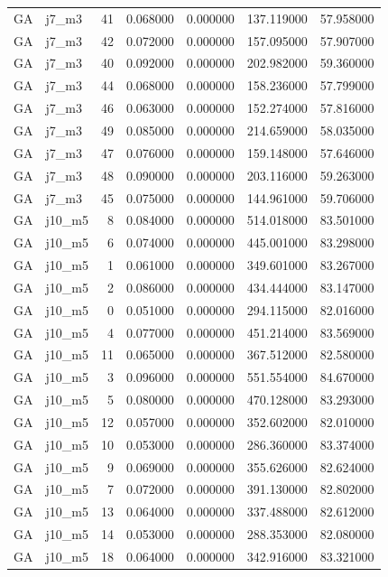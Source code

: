 \begin{tabular}{llrrrrr}
GA & j7_m3 & 41 & 0.068000 & 0.000000 & 137.119000 & 57.958000 \\
GA & j7_m3 & 42 & 0.072000 & 0.000000 & 157.095000 & 57.907000 \\
GA & j7_m3 & 40 & 0.092000 & 0.000000 & 202.982000 & 59.360000 \\
GA & j7_m3 & 44 & 0.068000 & 0.000000 & 158.236000 & 57.799000 \\
GA & j7_m3 & 46 & 0.063000 & 0.000000 & 152.274000 & 57.816000 \\
GA & j7_m3 & 49 & 0.085000 & 0.000000 & 214.659000 & 58.035000 \\
GA & j7_m3 & 47 & 0.076000 & 0.000000 & 159.148000 & 57.646000 \\
GA & j7_m3 & 48 & 0.090000 & 0.000000 & 203.116000 & 59.263000 \\
GA & j7_m3 & 45 & 0.075000 & 0.000000 & 144.961000 & 59.706000 \\
GA & j10_m5 & 8 & 0.084000 & 0.000000 & 514.018000 & 83.501000 \\
GA & j10_m5 & 6 & 0.074000 & 0.000000 & 445.001000 & 83.298000 \\
GA & j10_m5 & 1 & 0.061000 & 0.000000 & 349.601000 & 83.267000 \\
GA & j10_m5 & 2 & 0.086000 & 0.000000 & 434.444000 & 83.147000 \\
GA & j10_m5 & 0 & 0.051000 & 0.000000 & 294.115000 & 82.016000 \\
GA & j10_m5 & 4 & 0.077000 & 0.000000 & 451.214000 & 83.569000 \\
GA & j10_m5 & 11 & 0.065000 & 0.000000 & 367.512000 & 82.580000 \\
GA & j10_m5 & 3 & 0.096000 & 0.000000 & 551.554000 & 84.670000 \\
GA & j10_m5 & 5 & 0.080000 & 0.000000 & 470.128000 & 83.293000 \\
GA & j10_m5 & 12 & 0.057000 & 0.000000 & 352.602000 & 82.010000 \\
GA & j10_m5 & 10 & 0.053000 & 0.000000 & 286.360000 & 83.374000 \\
GA & j10_m5 & 9 & 0.069000 & 0.000000 & 355.626000 & 82.624000 \\
GA & j10_m5 & 7 & 0.072000 & 0.000000 & 391.130000 & 82.802000 \\
GA & j10_m5 & 13 & 0.064000 & 0.000000 & 337.488000 & 82.612000 \\
GA & j10_m5 & 14 & 0.053000 & 0.000000 & 288.353000 & 82.080000 \\
GA & j10_m5 & 18 & 0.064000 & 0.000000 & 342.916000 & 83.321000 \\

\end{tabular}
